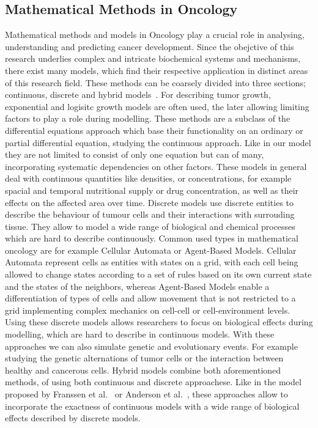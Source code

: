\subsection{Mathematical Methods in Oncology}
Mathematical methods and models in Oncology play a crucial role in analysing, understanding and predicting cancer development. Since the obejctive of this research underlies complex and intricate biochemical systems and mechanisms, there exist many models, which find their respective application in distinct areas of this research field. These methods can be coarsely divided into three sections; continuous, discrete and hybrid models~\cite{BEKISZ2020101198}. For describing tumor growth, exponential and logisitc growth models are often used, the later allowing limiting factors to play a role during modelling. These methods are a subclass of the differential equations approach which base their functionality on an ordinary or partial differential equation, studying the continuous approach. Like in our model they are not limited to consist of only one equation but can of many, incorporating systematic dependencies on other factors. These models in general deal with continuous quantities like densities, or concentrations, for example spacial and temporal nutritional supply or drug concentration, as well as their effects on the affected area over time. Discrete models use discrete entities to describe the behaviour of tumour cells and their interactions with surrouding tissue. They allow to model a wide range of biological and chemical processes which are hard to describe continuously. Common used types in mathematical oncology are for example Cellular Automata or Agent-Based Models. Cellular Automata represent cells as entities with states on a grid, with each cell being allowed to change states according to a set of rules based on its own current state and the states of the neighbors, whereas Agent-Based Models enable a differentiation of types of cells and allow movement that is not restricted to a grid implementing complex mechanics on cell-cell or cell-environment levels. Using these discrete models allows researchers to focus on biological effects during modelling, which are hard to describe in continuous models. With these approaches we can also simulate genetic and evolutionary events. For example studying the genetic alternations of tumor cells or the interaction between healthy and cancerous cells.\newline 
Hybrid models combine both aforementioned methods, of using both continuous and discrete approachese. Like in the model proposed by Franssen et al.~\cite{franssen_mathematical_2019} or Anderson et al.~\cite{anderson_continuous_1998}, these approaches allow to incorporate the exactness of continuous models with a wide range of biological effects described by discrete models. \newline
